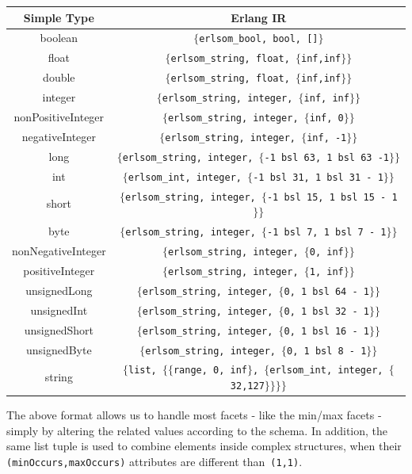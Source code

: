 \documentclass[submission,copyright,a4]{eptcs}
\begin{document}
\begin{center}\footnotesize
  \begin{tabular}{cc}
    \toprule
    Simple Type & Erlang IR\\
    \midrule
    boolean & \texttt{$\{$erlsom\_bool, bool, []$\}$}\\
    float & \texttt{$\{$erlsom\_string, float, $\{$inf,inf$\}\}$}\\
    double & \texttt{$\{$erlsom\_string, float, $\{$inf,inf$\}\}$}\\
    integer & \texttt{$\{$erlsom\_string, integer, $\{$inf, inf$\}\}$}\\
    nonPositiveInteger & \texttt{$\{$erlsom\_string, integer, $\{$inf, 0$\}\}$}\\
    negativeInteger & \texttt{$\{$erlsom\_string, integer, $\{$inf, -1$\}\}$}\\
    long & \texttt{$\{$erlsom\_string, integer, $\{$-1 bsl 63, 1 bsl 63 -1$\}\}$}\\
    int & \texttt{$\{$erlsom\_int, integer, $\{$-1 bsl 31, 1 bsl 31 - 1$\}\}$}\\
    short & \texttt{$\{$erlsom\_string, integer, $\{$-1 bsl 15, 1 bsl 15 - 1$\}\}$}\\
    byte & \texttt{$\{$erlsom\_string, integer, $\{$-1 bsl 7, 1 bsl 7 - 1$\}\}$}\\
    nonNegativeInteger & \texttt{$\{$erlsom\_string, integer, $\{$0, inf$\}\}$}\\
    positiveInteger & \texttt{$\{$erlsom\_string, integer, $\{$1, inf$\}\}$}\\
    unsignedLong & \texttt{$\{$erlsom\_string, integer, $\{$0, 1 bsl 64 - 1$\}\}$}\\
    unsignedInt & \texttt{$\{$erlsom\_string, integer, $\{$0, 1 bsl 32 - 1$\}\}$}\\
    unsignedShort & \texttt{$\{$erlsom\_string, integer, $\{$0, 1 bsl 16 - 1$\}\}$}\\
    unsignedByte & \texttt{$\{$erlsom\_string, integer, $\{$0, 1 bsl 8 - 1$\}\}$}\\
    string & \texttt{$\{$list, $\{\{$range, 0, inf$\}$, $\{$erlsom\_int, integer, $\{$32,127$\}\}\}\}$}\\
    \bottomrule
  \end{tabular}
\end{center}

The above format allows us to handle most facets - like the min/max facets - 
simply by altering the related values according to the schema. In addition, the
same list tuple is used to combine elements inside complex structures, when
their \texttt{(minOccurs,maxOccurs)} attributes are different than~\texttt{(1,1)}.
\end{document}

